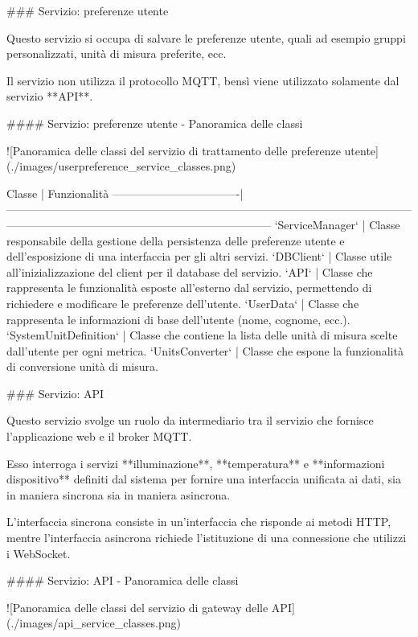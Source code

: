 ### Servizio: preferenze utente

Questo servizio si occupa di salvare le preferenze utente, quali ad esempio gruppi personalizzati, unità di misura preferite, ecc.

Il servizio non utilizza il protocollo MQTT, bensì viene utilizzato solamente dal servizio **API**.

#### Servizio: preferenze utente - Panoramica delle classi

![Panoramica delle classi del servizio di trattamento delle preferenze utente](./images/userpreference_service_classes.png)

Classe                            | Funzionalità
----------------------------------|-----------------------------------------------------------------------------------------------------------------------------------------------------------------------------------
`ServiceManager`                  | Classe responsabile della gestione della persistenza delle preferenze utente e dell'esposizione di una interfaccia per gli altri servizi.
`DBClient`                        | Classe utile all'inizializzazione del client per il database del servizio.
`API`                             | Classe che rappresenta le funzionalità esposte all'esterno dal servizio, permettendo di richiedere e modificare le preferenze dell'utente.
`UserData`                      | Classe che rappresenta le informazioni di base dell'utente (nome, cognome, ecc.).
`SystemUnitDefinition`          | Classe che contiene la lista delle unità di misura scelte dall'utente per ogni metrica.
`UnitsConverter` | Classe che espone la funzionalità di conversione unità di misura.

### Servizio: API

Questo servizio svolge un ruolo da intermediario tra il servizio che fornisce l'applicazione web e il broker MQTT.

Esso interroga i servizi **illuminazione**, **temperatura** e **informazioni dispositivo**  definiti dal sistema per fornire una interfaccia unificata ai dati, sia in maniera sincrona sia in maniera asincrona.

L'interfaccia sincrona consiste in un'interfaccia che risponde ai metodi HTTP, mentre l'interfaccia asincrona richiede l'istituzione di una connessione che utilizzi i WebSocket.

#### Servizio: API - Panoramica delle classi

![Panoramica delle classi del servizio di gateway delle API](./images/api_service_classes.png)

